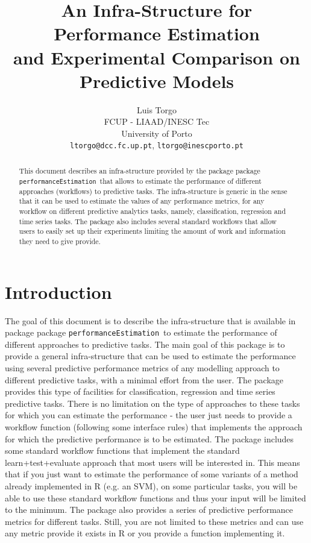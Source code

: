 \documentclass[10pt,a4paper]{article}\usepackage[]{graphicx}\usepackage[]{color}
\author{Luis Torgo\\FCUP - LIAAD/INESC Tec\\University of Porto\\
  \texttt{ltorgo@dcc.fc.up.pt}, \texttt{ltorgo@inescporto.pt}}
\title{An Infra-Structure for Performance Estimation\\ and Experimental Comparison on Predictive Models}
\newcommand{\PE}{package \texttt{performanceEstimation}\ }
\begin{document}
\maketitle

\begin{abstract}
  
   This document describes an infra-structure provided by the package \PE that allows to estimate the performance of different approaches (workflows) to predictive tasks.  The infra-structure is generic in the sense that it can be used to estimate the values of any performance metrics, for any workflow on different predictive analytics tasks, namely, classification, regression and time series tasks. The package also includes several standard workflows that allow users to easily set up their experiments limiting the amount of work and information they need to give provide.
   
\end{abstract}

\section{Introduction}

The goal of this document is to describe the infra-structure that is available in package \PE to  estimate the performance of different approaches to predictive tasks.  The main goal of this package is to provide a general infra-structure that can be used to estimate the performance using several predictive performance metrics of any modelling approach to different predictive tasks, with a minimal effort from the user. The package provides this type of facilities for classification, regression and time series predictive tasks. There is no limitation on the type of approaches to these tasks for which you can estimate the performance - the user just needs to provide a workflow function (following some interface rules) that implements the approach for which the predictive performance is to be estimated. The package includes some standard workflow functions that implement the standard learn+test+evaluate approach that most users will be interested in. This means that if you just want to estimate the performance of some variants of a method already implemented in R (e.g. an SVM), on some particular tasks, you will be able to use these standard workflow functions and thus your input will be limited to the minimum. The package also provides a series of predictive performance metrics for different tasks. Still, you are not limited to these metrics and can use any metric provide it exists in R or you provide a function implementing it. 
\end{document}
